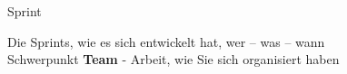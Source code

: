 
\begin{frame}[c]{Sprint}

  \begin{center}
    Die Sprints, wie es sich entwickelt hat, wer -- was -- wann
    \\ Schwerpunkt \textbf{Team} - Arbeit, wie Sie sich organisiert haben
  \end{center}

\end{frame}
